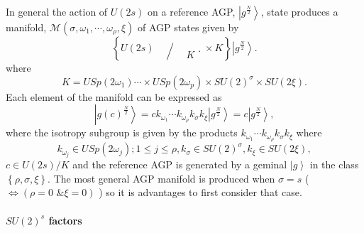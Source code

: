 \documentclass[aps,preprint]{revtex4}%
\begin{document}
In general the action of $U\left(  2s\right)  $ on a reference AGP,
$\left\vert g^{\frac{N}{2}}\right\rangle $, state produces a manifold,
$\mathcal{M}\left(  \sigma,\omega_{1},\cdots,\omega_{\rho},\xi\right)  $ of
AGP states given by
\begin{equation}
\left\{  U\left(  2s\right)
\genfrac{/}{.}{0pt}{}{{}}{K}%
\times K\right\}  \left\vert g^{\frac{N}{2}}\right\rangle . \label{su2act}%
\end{equation}
where
\begin{equation}
K=USp\left(  2\omega_{1}\right)  \cdots\times USp\left(  2\omega_{p}\right)
\times SU\left(  2\right)  ^{\sigma}\times SU\left(  2\xi\right)  .
\end{equation}
Each element of the manifold can be expressed as
\begin{equation}
\left\vert g\left(  c\right)  ^{\frac{N}{2}}\right\rangle =ck_{\omega_{1}%
}\cdots k_{\omega_{\rho}}k_{\sigma}k_{\xi}\left\vert g^{\frac{N}{2}%
}\right\rangle =c\left\vert g^{\frac{N}{2}}\right\rangle ,
\end{equation}
where the isotropy subgroup is given by the products $k_{\omega_{1}}\cdots
k_{\omega_{\rho}}k_{\sigma}k_{\xi}$ where%
\begin{equation}
k_{\omega_{j}}\in USp\left(  2\omega_{j}\right)  ;1\leq j\leq\rho,k_{\sigma
}\in SU\left(  2\right)  ^{\sigma},k_{\xi}\in SU\left(  2\xi\right)  ,
\end{equation}
$c\in U\left(  2s\right)  /K$ and the reference AGP is generated by a geminal
$\left\vert g\right\rangle $ in the class $\left\{  \rho,\sigma,\xi\right\}
.$ The most general AGP manifold is produced when $\sigma=s$ ($\Leftrightarrow
\left(  \rho=0\text{ \& }\xi=0\right)  $ ) so it is advantages to first
consider that case.

\paragraph{$SU\left(  2\right)  ^{s}$ factors}
\end{document}
